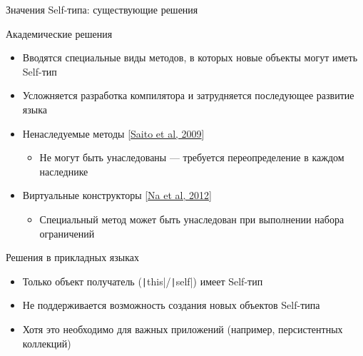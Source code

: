 \documentclass[usenames, dvipsnames]{beamer}
\begin{document}
    \begin{frame}{Значения Self-типа: существующие решения}
        \begin{block}{Академические решения}
            \begin{itemize}
                \item Вводятся специальные виды методов, в которых новые объекты могут иметь Self-тип
                \item Усложняется разработка компилятора и затрудняется последующее развитие языка
                \item Ненаследуемые методы [\href{http://www.fos.kuis.kyoto-u.ac.jp/~igarashi/papers/pdf/thistype-SAC09.pdf}{Saito et al, 2009}]
                \begin{itemize}
                    \item Не могут быть унаследованы --- требуется переопределение в каждом наследнике
                \end{itemize}
                \item Виртуальные конструкторы [\href{https://www.researchgate.net/profile/Sukyoung-Ryu/publication/254004584_Exact_type_parameterization_and_ThisType_support/links/54b90ed10cf269d8cbf72d01/Exact-type-parameterization-and-ThisType-support.pdf}{Na et al, 2012}]
                \begin{itemize}
                    \item Специальный метод может быть унаследован при выполнении набора ограничений
                \end{itemize}
            \end{itemize}
        \end{block}

        \begin{block}{Решения в прикладных языках}
            \begin{itemize}
                \item Только объект получатель (\texttt|this|/\texttt|self|) имеет Self-тип
                \item Не поддерживается возможность создания новых объектов Self-типа
                \item Хотя это необходимо для важных приложений (например, персистентных коллекций)
            \end{itemize}
        \end{block}
    \end{frame}
\end{document}

